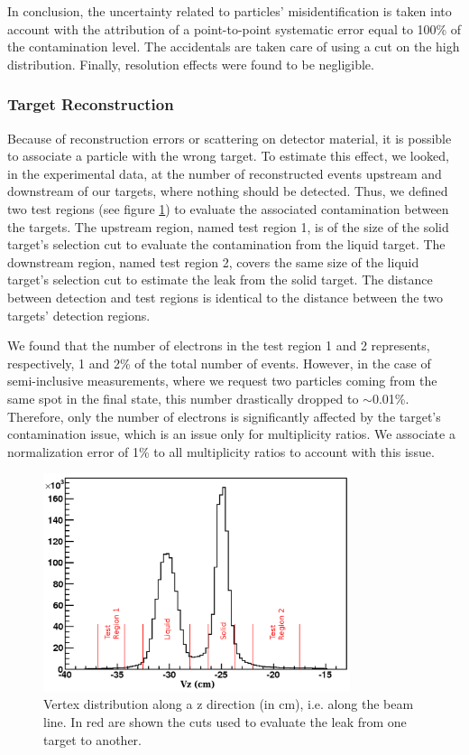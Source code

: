 In conclusion, the uncertainty related to particles' misidentification is 
taken into account with the attribution of a point-to-point systematic 
error equal to 100\% of the contamination level. The accidentals are taken 
care of using a cut on the high \pt distribution. Finally, resolution effects
were found to be negligible.

\subsubsection{Target Reconstruction}

Because of reconstruction errors or scattering on detector material, it 
is possible to associate a particle with the wrong target. To estimate this 
effect, we looked, in the experimental data, at the number of reconstructed 
events upstream and downstream of our targets, where nothing should be 
detected. Thus, we defined two test regions (see figure \ref{fig:targetleak}) 
to evaluate the associated contamination between the targets. The upstream 
region, named test region 1, is of the size of the solid target's selection 
cut to evaluate the contamination from the liquid target. The downstream region, 
named test region 2, covers the same size of the liquid target's selection cut 
to estimate the leak from the solid target. The distance between detection and 
test regions is identical to the distance between the two targets' detection 
regions. 

We found that the number of electrons in the test region 1 and 2 represents, 
respectively, 1 and 2\% of the total number of events. However, in the case 
of semi-inclusive measurements, where we request two particles coming from the
same spot in the final state, this number drastically dropped to $\sim$0.01\%. 
Therefore, only the number of electrons is significantly affected by the 
target's contamination issue, which is an issue only for multiplicity ratios.
We associate a normalization error of 1\% to all multiplicity ratios to account
with this issue.

\begin{figure}[tbp]
\centering
\includegraphics[width=9cm] {chap5-fig/Vertex.png}
\caption {Vertex distribution along a z direction (in cm), i.e. along the 
beam line. In red are shown the cuts used to evaluate the leak from one target to 
another.}
\label{fig:targetleak}
\end{figure}

